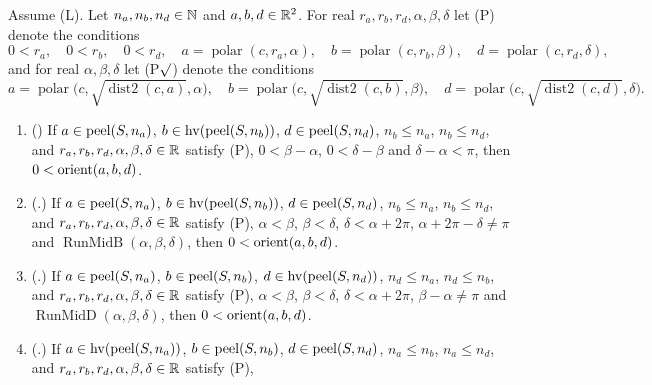 \begin{theorem}\label{pc:thm:layers}
Assume \textup{(L)}. Let $n_a,n_b,n_d\in\mathbb N$ and $a,b,d\in\mathbb R^2$. For real $r_a,r_b,r_d,\alpha,\beta,\delta$ let
\textup{(P)} denote the conditions
\[
  0<r_a,\quad 0<r_b,\quad 0<r_d,\quad a=\operatorname{polar}(c,r_a,\alpha),\quad b=\operatorname{polar}(c,r_b,\beta),
  \quad d=\operatorname{polar}(c,r_d,\delta),
\]
and for real $\alpha,\beta,\delta$ let \textup{(P$\surd$)} denote the conditions
\[
  a=\operatorname{polar}\bigl(c,\sqrt{\operatorname{dist2}(c,a)},\alpha\bigr),\quad
  b=\operatorname{polar}\bigl(c,\sqrt{\operatorname{dist2}(c,b)},\beta\bigr),\quad
  d=\operatorname{polar}\bigl(c,\sqrt{\operatorname{dist2}(c,d)},\delta\bigr).
\]
\begin{enumerate}[label=(\alph*)]
\item \textup{()} If $a\in\operatorname{peel}(S,n_a)$, $b\in\operatorname{hv}(\operatorname{peel}(S,n_b))$, $d\in\operatorname{peel}(S,n_d)$,
  $n_b\le n_a$, $n_b\le n_d$, and $r_a,r_b,r_d,\alpha,\beta,\delta\in\mathbb R$ satisfy \textup{(P)}, $0<\beta-\alpha$,
  $0<\delta-\beta$ and $\delta-\alpha<\pi$, then $0<\operatorname{orient}(a,b,d)$.
\item \textup{(.)}
  If $a\in\operatorname{peel}(S,n_a)$, $b\in\operatorname{hv}(\operatorname{peel}(S,n_b))$,
  $d\in\operatorname{peel}(S,n_d)$, $n_b\le n_a$, $n_b\le n_d$, and $r_a,r_b,r_d,\alpha,\beta,\delta\in\mathbb R$ satisfy \textup{(P)},
  $\alpha<\beta$, $\beta<\delta$, $\delta<\alpha+2\pi$, $\alpha+2\pi-\delta\neq\pi$ and
  $\operatorname{RunMidB}(\alpha,\beta,\delta)$, then $0<\operatorname{orient}(a,b,d)$.
\item \textup{(.)}
  If $a\in\operatorname{peel}(S,n_a)$, $b\in\operatorname{peel}(S,n_b)$,
  $d\in\operatorname{hv}(\operatorname{peel}(S,n_d))$, $n_d\le n_a$, $n_d\le n_b$, and $r_a,r_b,r_d,\alpha,\beta,\delta\in\mathbb R$ satisfy
  \textup{(P)}, $\alpha<\beta$, $\beta<\delta$, $\delta<\alpha+2\pi$, $\beta-\alpha\neq\pi$ and
  $\operatorname{RunMidD}(\alpha,\beta,\delta)$, then $0<\operatorname{orient}(a,b,d)$.
\item \textup{(.)}
  If $a\in\operatorname{hv}(\operatorname{peel}(S,n_a))$, $b\in\operatorname{peel}(S,n_b)$,
  $d\in\operatorname{peel}(S,n_d)$, $n_a\le n_b$, $n_a\le n_d$, and $r_a,r_b,r_d,\alpha,\beta,\delta\in\mathbb R$ satisfy \textup{(P)},

\end{enumerate}
\end{theorem}
